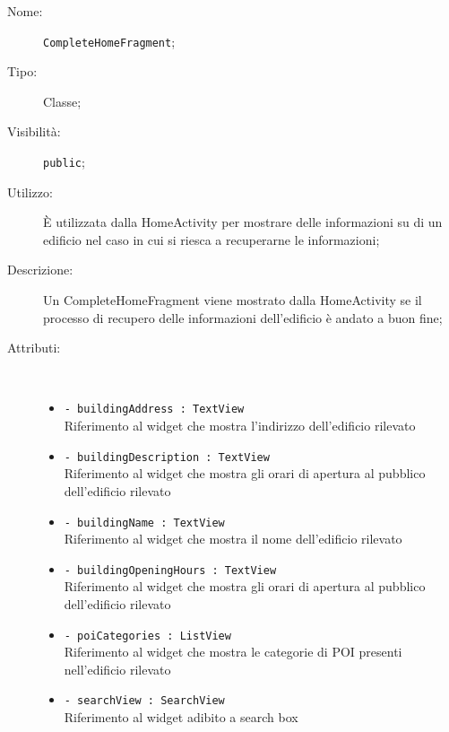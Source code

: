 \documentclass[../DefinizioneDiProdotto.tex]{subfiles}
\begin{document}
\begin{description}
	\item[Nome:] \texttt{CompleteHomeFragment};
	\item[Tipo:] Classe;
	\item[Visibilità:] \texttt{public};
	\item[Utilizzo:] È utilizzata dalla HomeActivity per mostrare delle informazioni su di un edificio nel caso in cui si riesca a recuperarne le informazioni;
	\item[Descrizione:] Un CompleteHomeFragment viene mostrato dalla HomeActivity se il processo di recupero delle informazioni dell'edificio è andato a buon fine;
	\item[Attributi:] \
	\begin{itemize}
		\item \texttt{- buildingAddress : TextView}\\
		Riferimento al widget che mostra l'indirizzo dell'edificio rilevato
		
		\item \texttt{- buildingDescription : TextView}\\
		Riferimento al widget che mostra gli orari di apertura al pubblico dell'edificio rilevato
		
		\item \texttt{- buildingName : TextView}\\
		Riferimento al widget che mostra il nome dell'edificio rilevato
		
		\item \texttt{- buildingOpeningHours : TextView}\\
		Riferimento al widget che mostra gli orari di apertura al pubblico dell'edificio rilevato
		
		\item \texttt{- poiCategories : ListView}\\
		Riferimento al widget che mostra le categorie di POI presenti nell'edificio rilevato
		
		\item \texttt{- searchView : SearchView}\\
		Riferimento al widget adibito a search box
		

\end{itemize}
\end{description}
\end{document}
